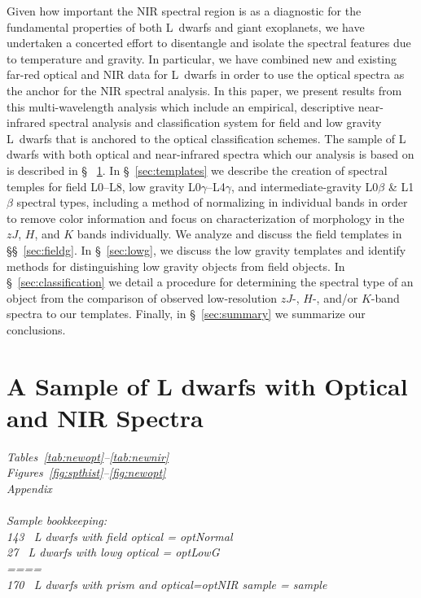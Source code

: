 \documentclass[12pt,preprint]{aastex}
\newcommand{\sample}{170}
\newcommand{\optField}{143}
\newcommand{\optLowG}{27}
\begin{document}
Given how important the NIR spectral region is as a diagnostic for the fundamental properties of both L~dwarfs and giant exoplanets, we have undertaken a concerted effort to disentangle and isolate the spectral features due to temperature and gravity.
In particular, we have combined new and existing far-red optical and NIR data for L~dwarfs in order to use the optical spectra as the anchor for the NIR spectral analysis.
In this paper, we present results from this multi-wavelength analysis which include an empirical, descriptive near-infrared spectral analysis and classification system for field and low gravity L~dwarfs that is anchored to the optical classification schemes.
The sample of L dwarfs with both optical and near-infrared spectra which our analysis is based on is described in \S~ \ref{sec:sample}.
In \S~\ref{sec:templates} we describe the creation of spectral temples for field L0--L8, low gravity L0$\gamma$--L4$\gamma$, and intermediate-gravity L0$\beta$ \& L1$\beta$ spectral types, including a method of normalizing in individual bands in order to remove color information and focus on characterization of morphology in the $zJ$, $H$, and $K$ bands individually.
We analyze and discuss the field templates in \S\S~\ref{sec:fieldg}.
In \S~\ref{sec:lowg}, we discuss the low gravity templates and identify methods for distinguishing low gravity objects from field objects.
In \S~\ref{sec:classification} we detail a procedure for determining the spectral type of an object from the comparison of observed low-resolution $zJ$-, $H$-, and/or $K$-band spectra to our templates.
Finally, in \S~\ref{sec:summary} we summarize our conclusions.



\clearpage
\section{A Sample of L dwarfs with Optical and NIR Spectra}
\label{sec:sample}

\emph{
Tables~\ref{tab:newopt}--\ref{tab:newnir}\\
Figures~\ref{fig:spthist}--\ref{fig:newopt}\\
Appendix\\
\\
Sample bookkeeping:\\
\optField~ L dwarfs with field optical =  \emph{optNormal}\\
\optLowG~ L dwarfs with lowg optical = \emph{optLowG} \\
====\\
\sample~ L dwarfs with prism and optical=optNIR sample = \emph{sample}\\
}
\end{document}
